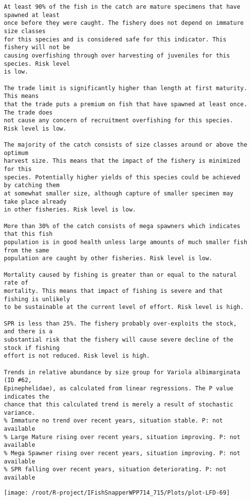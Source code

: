 \documentclass{report}\usepackage[]{graphicx}\usepackage[]{color}
\makeatletter
\def\maxwidth{ %
  \ifdim\Gin@nat@width>\linewidth
    \linewidth
  \else
    \Gin@nat@width
  \fi
}
\newenvironment{kframe}{%
 \def\at@end@of@kframe{}%
 \ifinner\ifhmode%
  \def\at@end@of@kframe{\end{minipage}}%
  \begin{minipage}{\columnwidth}%
 \fi\fi%
 \def\FrameCommand##1{\hskip\@totalleftmargin \hskip-\fboxsep
 \colorbox{shadecolor}{##1}\hskip-\fboxsep
     \hskip-\linewidth \hskip-\@totalleftmargin \hskip\columnwidth}%
 \MakeFramed {\advance\hsize-\width
   \@totalleftmargin\z@ \linewidth\hsize
   \@setminipage}}%
 {\par\unskip\endMakeFramed%
 \at@end@of@kframe}
\newenvironment{knitrout}{}{} %
\makeatother
\begin{document}
\begin{knitrout}
\begin{kframe}
\begin{verbatim}
At least 90% of the fish in the catch are mature specimens that have spawned at least
once before they were caught. The fishery does not depend on immature size classes
for this species and is considered safe for this indicator. This fishery will not be
causing overfishing through over harvesting of juveniles for this species. Risk level
is low.

The trade limit is significantly higher than length at first maturity.  This means
that the trade puts a premium on fish that have spawned at least once. The trade does
not cause any concern of recruitment overfishing for this species. Risk level is low.

The majority of the catch consists of size classes around or above the optimum
harvest size. This means that the impact of the fishery is minimized for this
species. Potentially higher yields of this species could be achieved by catching them
at somewhat smaller size, although capture of smaller specimen may take place already
in other fisheries. Risk level is low.

More than 30% of the catch consists of mega spawners which indicates that this fish
population is in good health unless large amounts of much smaller fish from the same
population are caught by other fisheries. Risk level is low.
 
Mortality caused by fishing is greater than or equal to the natural rate of
mortality. This means that impact of fishing is severe and that fishing is unlikely
to be sustainable at the current level of effort. Risk level is high.
 
SPR is less than 25%. The fishery probably over-exploits the stock, and there is a
substantial risk that the fishery will cause severe decline of the stock if fishing
effort is not reduced. Risk level is high.
 
Trends in relative abundance by size group for Variola albimarginata (ID #62,
Epinephelidae), as calculated from linear regressions. The P value indicates the
chance that this calculated trend is merely a result of stochastic variance.
% Immature no trend over recent years, situation stable. P: not available
% Large Mature rising over recent years, situation improving. P: not available
% Mega Spawner rising over recent years, situation improving. P: not available
% SPR falling over recent years, situation deteriorating. P: not available
\end{verbatim}
\end{kframe}
\texttt{[image: /root/R-project/IFishSnapperWPP714\_715/Plots/plot-LFD-69]} 


\end{knitrout}
\end{document}
